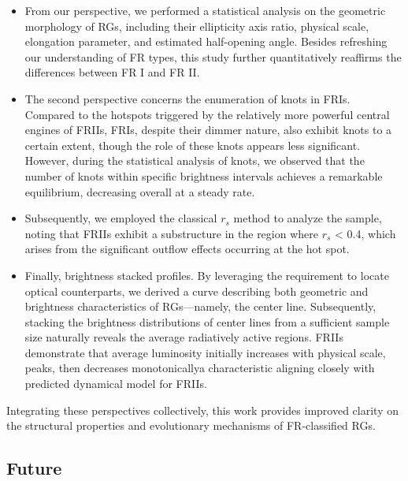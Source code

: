 \documentclass{aa}
\begin{document}
\begin{itemize}[label=$\star$]

    \item From our perspective, we performed a statistical analysis on the geometric morphology of RGs, including their ellipticity axis ratio, physical scale, elongation parameter, and estimated half-opening angle. Besides refreshing our understanding of FR types, this study further quantitatively reaffirms the differences between FR I and FR II.
    
    \item The second perspective concerns the enumeration of knots in FRIs. Compared to the hotspots triggered by the relatively more powerful central engines of FRIIs, FRIs, despite their dimmer nature, also exhibit knots to a certain extent, though the role of these knots appears less significant. However, during the statistical analysis of knots, we observed that the number of knots within specific brightness intervals achieves a remarkable equilibrium, decreasing overall at a steady rate.
    
    \item Subsequently, we employed the classical $r_s$ method to analyze the sample, noting that FRIIs exhibit a substructure in the region where $r_s$ < 0.4, which arises from the significant outflow effects occurring at the hot spot.
    
    \item Finally, brightness stacked profiles. By leveraging the requirement to locate optical counterparts, we derived a curve describing both geometric and brightness characteristics of RGs—namely, the center line. Subsequently, stacking the brightness distributions of center lines from a sufficient sample size naturally reveals the average radiatively active regions. FRIIs demonstrate that average luminosity initially increases with physical scale, peaks, then decreases monotonically\textemdash a characteristic aligning closely with \cite{turner_energetics_2015} predicted dynamical model for FRIIs.
    
\end{itemize}

Integrating these perspectives collectively, this work provides improved clarity on the structural properties and evolutionary mechanisms of FR-classified RGs.




\subsection{Future}\label{sec:Future}
\end{document}
